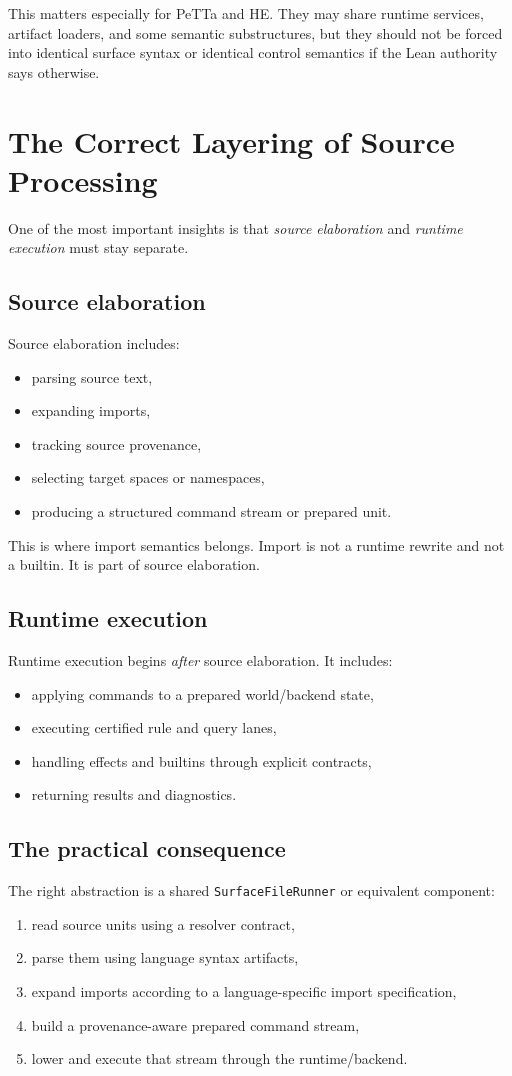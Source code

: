 \documentclass[11pt]{article}
\begin{document}
This matters especially for PeTTa and HE. They may share runtime services, artifact loaders, and some semantic substructures, but they should not be forced into identical surface syntax or identical control semantics if the Lean authority says otherwise.

\section{The Correct Layering of Source Processing}

One of the most important insights is that \emph{source elaboration} and \emph{runtime execution} must stay separate.

\subsection{Source elaboration}
Source elaboration includes:
\begin{itemize}
  \item parsing source text,
  \item expanding imports,
  \item tracking source provenance,
  \item selecting target spaces or namespaces,
  \item producing a structured command stream or prepared unit.
\end{itemize}

This is where import semantics belongs. Import is not a runtime rewrite and not a builtin. It is part of source elaboration.

\subsection{Runtime execution}
Runtime execution begins \emph{after} source elaboration. It includes:
\begin{itemize}
  \item applying commands to a prepared world/backend state,
  \item executing certified rule and query lanes,
  \item handling effects and builtins through explicit contracts,
  \item returning results and diagnostics.
\end{itemize}

\subsection{The practical consequence}
The right abstraction is a shared \texttt{SurfaceFileRunner} or equivalent component:
\begin{enumerate}
  \item read source units using a resolver contract,
  \item parse them using language syntax artifacts,
  \item expand imports according to a language-specific import specification,
  \item build a provenance-aware prepared command stream,
  \item lower and execute that stream through the runtime/backend.
\end{enumerate}
\end{document}
